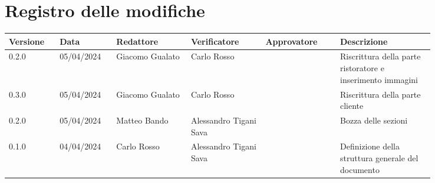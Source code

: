 \section*{Registro delle modifiche}
 {
  \scriptsize
  \begin{tabular}{p{0.10\linewidth}p{0.10\linewidth}p{0.15\linewidth}p{0.15\linewidth}p{0.15\linewidth}p{0.19\linewidth}}
	  \textbf{Versione} & \textbf{Data} & \textbf{Redattore}     & \textbf{Verificatore} & \textbf{Approvatore} & \textbf{Descrizione}                                                                                             \\
	  \hline
	  0.2.0             & 05/04/2024    & Giacomo Gualato & Carlo Rosso						&					& Riscrittura della parte ristoratore e inserimento immagini \\
	  \hline
	  0.3.0             & 05/04/2024    & Giacomo Gualato & Carlo Rosso						&					& Riscrittura della parte cliente \\
	  \hline
	  0.2.0             & 05/04/2024    & Matteo Bando & Alessandro Tigani Sava				&               	& Bozza delle sezioni \\ 
	  \hline
	  0.1.0             & 04/04/2024    & Carlo Rosso & Alessandro Tigani Sava              &               	& Definizione della struttura generale del documento \\
	\hline
	\end{tabular}
 }
